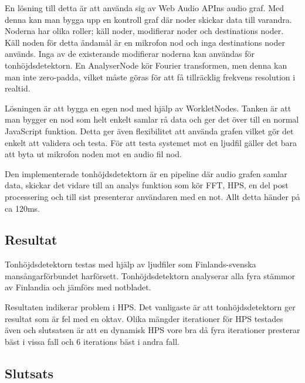En lösning till detta är att använda sig av Web Audio APIns audio graf. Med denna kan man bygga upp en kontroll graf där noder skickar data till varandra. Noderna har olika roller; käll noder, modifierar noder och destinations noder. Käll noden för detta ändamål är en mikrofon nod och inga destinations noder används. Inga av de existerande modifierar noderna kan användas för tonhöjdsdetektorn. En AnalyserNode kör Fourier transformen, men denna kan man inte zero-padda, vilket måste göras för att få tillräcklig frekvens resolution i realtid. 

Lösningen är att bygga en egen nod med hjälp av WorkletNodes. Tanken är att man bygger en nod som helt enkelt samlar rå data och ger det över till en normal JavaScript funktion. Detta ger även flexibilitet att använda grafen vilket gör det enkelt att validera och testa. För att testa systemet mot en ljudfil gäller det bara att byta ut mikrofon noden mot en audio fil nod.  

Den implementerade tonhöjdsdetektorn är en pipeline där audio grafen samlar data, skickar det vidare till an analys funktion som kör FFT, HPS, en del post processering och till sist presenterar användaren med en not. Allt detta händer på ca 120ms. 
\subsection{Resultat}
Tonhöjdsdetektorn testas med hjälp av ljudfiler som Finlands-svenska mansångarförbundet harförsett. Tonhöjdsdetektorn analyserar alla fyra stämmor av Finlandia och jämförs med notbladet. 

Resultaten indikerar problem i HPS. Det vanligaste är att tonhöjdsdetektorn ger resultat som är fel med en oktav. Olika mängder iterationer för HPS testades även och slutsatsen är att en dynamisk HPS vore bra då fyra iterationer presterar bäst i vissa fall och 6 iterations bäst i andra fall. 

\subsection{Slutsats}
